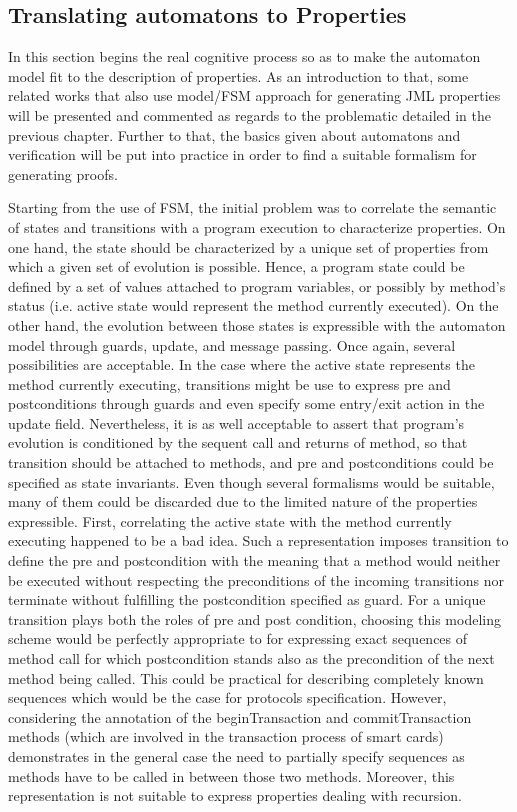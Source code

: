 \subsection{Translating automatons to Properties}
In this section begins the real cognitive process so as to make the automaton model fit to the description of properties. As an introduction to that, some related works that also use model/FSM approach for generating JML properties will be presented and commented as regards to the problematic detailed in the previous chapter. Further to that, the basics given about automatons and verification will be put into practice in order to find a suitable formalism for generating proofs. 

Starting from the use of FSM, the initial problem was to correlate the semantic of states and transitions with a program execution to characterize properties. On one hand, the state should be characterized by a unique set of properties from which a given set of evolution is possible. Hence, a program state could be defined by a set of values attached to program variables, or possibly by method's status (i.e. active state would represent the method currently executed). On the other hand, the evolution between those states is expressible with the automaton model through guards, update, and message passing. Once again, several possibilities are acceptable. In the case where the active state represents the method currently executing, transitions might be use to express pre and postconditions through guards and even specify some entry/exit action in the update field. Nevertheless, it is as well acceptable to assert that program's evolution is conditioned by the sequent call and returns of method, so that transition should be attached to methods, and pre and postconditions could be specified as state invariants.
Even though several formalisms would be suitable, many of them could be discarded due to the limited nature of the properties expressible. First, correlating the active state with the method currently executing happened to be a bad idea. Such a representation imposes transition to define the pre and postcondition with the meaning that a method would neither be executed without respecting the preconditions of the incoming transitions nor terminate without fulfilling the postcondition specified as guard. For a unique transition plays both the roles of pre and post condition, choosing this modeling scheme would be perfectly appropriate to for expressing exact sequences of method call for which postcondition stands also as the precondition of the next method being called. This could be practical for describing completely known sequences which would be the case for protocols specification. However, considering the annotation of the beginTransaction and commitTransaction methods (which are involved in the transaction process of smart cards) demonstrates in the general case the need to partially specify sequences as methods have to be called in between those two methods. Moreover, this representation is not suitable to express properties dealing with recursion.
